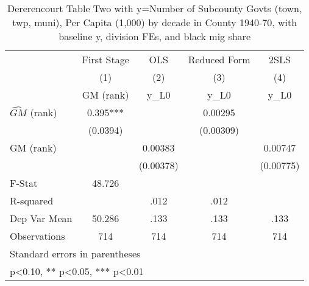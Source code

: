 \begin{table}[htbp]\centering
\def\sym#1{\ifmmode^{#1}\else\(^{#1}\)\fi}
\caption{Dererencourt Table Two with y=Number of Subcounty Govts (town, twp, muni), Per Capita (1,000) by decade in County 1940-70, with baseline y, division FEs, and black mig share}
\begin{tabular}{l*{4}{c}}
\toprule
                    & First Stage   &         OLS   &Reduced Form   &        2SLS   \\
                    &\multicolumn{1}{c}{(1)}&\multicolumn{1}{c}{(2)}&\multicolumn{1}{c}{(3)}&\multicolumn{1}{c}{(4)}\\
                    &\multicolumn{1}{c}{GM  (rank)}&\multicolumn{1}{c}{y\_L0}&\multicolumn{1}{c}{y\_L0}&\multicolumn{1}{c}{y\_L0}\\
\midrule
$\hat{GM}$ (rank)   &       0.395***&               &     0.00295   &               \\
                    &    (0.0394)   &               &   (0.00309)   &               \\
\addlinespace
GM  (rank)          &               &     0.00383   &               &     0.00747   \\
                    &               &   (0.00378)   &               &   (0.00775)   \\
\midrule
F-Stat              &      48.726   &               &               &               \\
R-squared           &               &        .012   &        .012   &               \\
Dep Var Mean        &      50.286   &        .133   &        .133   &        .133   \\
Observations        &         714   &         714   &         714   &         714   \\
\bottomrule
\multicolumn{5}{l}{\footnotesize Standard errors in parentheses}\\
\multicolumn{5}{l}{\footnotesize * p<0.10, ** p<0.05, *** p<0.01}\\
\end{tabular}
\end{table}
